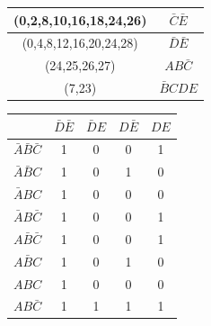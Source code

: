     \begin{table}[H]
        \begin{center}
            \def\arraystretch{1.5}
            \begin{tabular}{|c|c|}
                \hline
                (0,2,8,10,16,18,24,26) &	$\bar{C}\bar{E}$ \\
                \hline
                (0,4,8,12,16,20,24,28) & $\bar{D}\bar{E}$ \\
                \hline  
                (24,25,26,27) & $AB\bar{C}$ \\
                \hline   
                (7,23) & $\bar{B}CDE$ \\
                \hline           
                
            \end{tabular}
        \end{center}

    \end{table}


    
    \begin{table}[H]
        \begin{center}
            \def\arraystretch{1.5}
            \begin{tabular}{|c|c|c|c|c|}
                \hline
                &	$\bar{D}\bar{E}$ &	$\bar{D}E$ &	$D\bar{E}$ & $DE$ \\
                \hline
                $\bar{A}\bar{B}\bar{C}$ & 1 & 0 & 0 & 1 \\
                \hline          
                $\bar{A}\bar{B}C$ & 1 & 0 & 1 & 0 \\
                \hline   
                $\bar{A}BC$ & 1 & 0 & 0 & 0 \\
                \hline     
                $\bar{A}B\bar{C}$  & 1 & 0 & 0 & 1 \\
                \hline
                
                $A\bar{B}\bar{C}$ & 1 & 0 & 0 & 1 \\
                
                \hline
                
                $A\bar{B}C$ & 1 & 0 & 1 & 0 \\
                \hline
                
                $ABC$ & 1 & 0 & 0 & 0 \\
                \hline
                
                $AB\bar{C}$ & 1 & 1 & 1 & 1 \\
                \hline
                
            \end{tabular}
        \end{center}

    \end{table}



